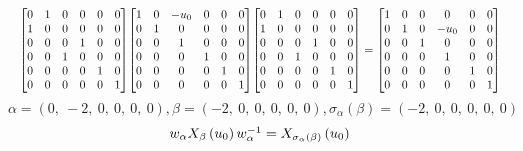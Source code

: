 \documentclass[11pt]{article}
\theoremstyle{definition}
\begin{document}
\[
\scaletoalign{\textwidth}{{\left[\begin{matrix}0 & 1 & 0 & 0 & 0 & 0\\1 & 0 & 0 & 0 & 0 & 0\\0 & 0 & 0 & 1 & 0 & 0\\0 & 0 & 1 & 0 & 0 & 0\\0 & 0 & 0 & 0 & 1 & 0\\0 & 0 & 0 & 0 & 0 & 1\end{matrix}\right]} {\left[\begin{matrix}1 & 0 & - u_{0} & 0 & 0 & 0\\0 & 1 & 0 & 0 & 0 & 0\\0 & 0 & 1 & 0 & 0 & 0\\0 & 0 & 0 & 1 & 0 & 0\\0 & 0 & 0 & 0 & 1 & 0\\0 & 0 & 0 & 0 & 0 & 1\end{matrix}\right]} {\left[\begin{matrix}0 & 1 & 0 & 0 & 0 & 0\\1 & 0 & 0 & 0 & 0 & 0\\0 & 0 & 0 & 1 & 0 & 0\\0 & 0 & 1 & 0 & 0 & 0\\0 & 0 & 0 & 0 & 1 & 0\\0 & 0 & 0 & 0 & 0 & 1\end{matrix}\right]} = {\left[\begin{matrix}1 & 0 & 0 & 0 & 0 & 0\\0 & 1 & 0 & - u_{0} & 0 & 0\\0 & 0 & 1 & 0 & 0 & 0\\0 & 0 & 0 & 1 & 0 & 0\\0 & 0 & 0 & 0 & 1 & 0\\0 & 0 & 0 & 0 & 0 & 1\end{matrix}\right]}}
\]
\[
\alpha = \left( 0, \  -2, \  0, \  0, \  0, \  0\right), \beta = \left( -2, \  0, \  0, \  0, \  0, \  0\right), \sigma_{\alpha}(\beta) = \left( -2, \  0, \  0, \  0, \  0, \  0\right)
\]
\[
\scaletoalign{\textwidth}{w_{\alpha} X_{\beta}\left(u_{0}\right) w_{\alpha}^{-1} = X_{\sigma_{\alpha}\left(\beta\right)}\left(u_{0}\right)}
\]
\end{document}

